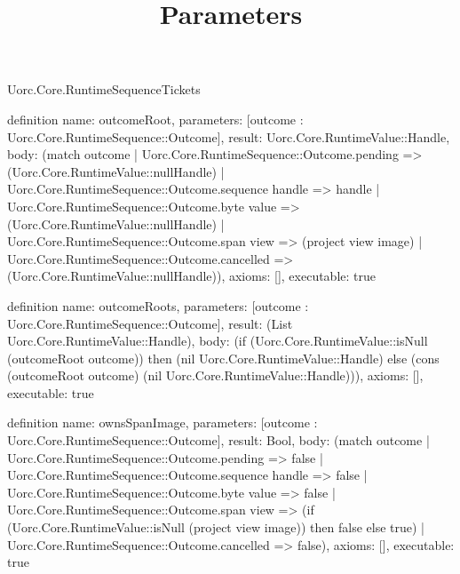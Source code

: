\begin{lexlean}{Uorc.Core.RuntimeSequenceTickets}
\title{Parameters}
\begin{semanticmodule}
definition{
  name: outcomeRoot,
  parameters: [outcome : Uorc.Core.RuntimeSequence::Outcome],
  result: Uorc.Core.RuntimeValue::Handle,
  body: (match outcome
    | Uorc.Core.RuntimeSequence::Outcome.pending => (Uorc.Core.RuntimeValue::nullHandle)
    | Uorc.Core.RuntimeSequence::Outcome.sequence handle => handle
    | Uorc.Core.RuntimeSequence::Outcome.byte value => (Uorc.Core.RuntimeValue::nullHandle)
    | Uorc.Core.RuntimeSequence::Outcome.span view => (project view image)
    | Uorc.Core.RuntimeSequence::Outcome.cancelled => (Uorc.Core.RuntimeValue::nullHandle)),
  axioms: [],
  executable: true
}

definition{
  name: outcomeRoots,
  parameters: [outcome : Uorc.Core.RuntimeSequence::Outcome],
  result: (List Uorc.Core.RuntimeValue::Handle),
  body: (if (Uorc.Core.RuntimeValue::isNull (outcomeRoot outcome)) then (nil Uorc.Core.RuntimeValue::Handle) else (cons (outcomeRoot outcome) (nil Uorc.Core.RuntimeValue::Handle))),
  axioms: [],
  executable: true
}

definition{
  name: ownsSpanImage,
  parameters: [outcome : Uorc.Core.RuntimeSequence::Outcome],
  result: Bool,
  body: (match outcome
    | Uorc.Core.RuntimeSequence::Outcome.pending => false
    | Uorc.Core.RuntimeSequence::Outcome.sequence handle => false
    | Uorc.Core.RuntimeSequence::Outcome.byte value => false
    | Uorc.Core.RuntimeSequence::Outcome.span view => (if (Uorc.Core.RuntimeValue::isNull (project view image)) then false else true)
    | Uorc.Core.RuntimeSequence::Outcome.cancelled => false),
  axioms: [],
  executable: true
}
\end{semanticmodule}
\end{lexlean}
